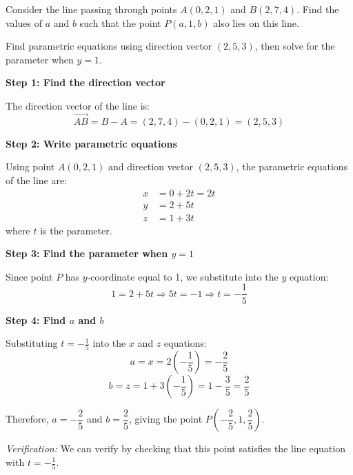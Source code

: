 \vspace{1em}

\begin{problem}
Consider the line passing through points $A(0, 2, 1)$ and $B(2, 7, 4)$. Find the values of $a$ and $b$ such that the point $P(a, 1, b)$ also lies on this line.
\end{problem}

\begin{hint}
Find parametric equations using direction vector $(2, 5, 3)$, then solve for the parameter when $y = 1$.
\end{hint}

\begin{solution}[Sketch]
\textbf{Step 1: Find the direction vector}

The direction vector of the line is:
$$\vec{AB} = B - A = (2, 7, 4) - (0, 2, 1) = (2, 5, 3)$$

\vspace{0.3em}

\textbf{Step 2: Write parametric equations}

Using point $A(0, 2, 1)$ and direction vector $(2, 5, 3)$, the parametric equations of the line are:
\begin{align*}
x &= 0 + 2t = 2t \\
y &= 2 + 5t \\
z &= 1 + 3t
\end{align*}
where $t$ is the parameter.

\vspace{0.3em}

\textbf{Step 3: Find the parameter when $y = 1$}

Since point $P$ has $y$-coordinate equal to 1, we substitute into the $y$ equation:
$$1 = 2 + 5t \Rightarrow 5t = -1 \Rightarrow t = -\frac{1}{5}$$

\vspace{0.3em}

\textbf{Step 4: Find $a$ and $b$}

Substituting $t = -\frac{1}{5}$ into the $x$ and $z$ equations:
$$a = x = 2\left(-\frac{1}{5}\right) = -\frac{2}{5}$$
$$b = z = 1 + 3\left(-\frac{1}{5}\right) = 1 - \frac{3}{5} = \frac{2}{5}$$

Therefore, $a = -\dfrac{2}{5}$ and $b = \dfrac{2}{5}$, giving the point $P\left(-\dfrac{2}{5}, 1, \dfrac{2}{5}\right)$.

\vspace{0.3em}

\textit{Verification:} We can verify by checking that this point satisfies the line equation with $t = -\frac{1}{5}$.
\end{solution}

